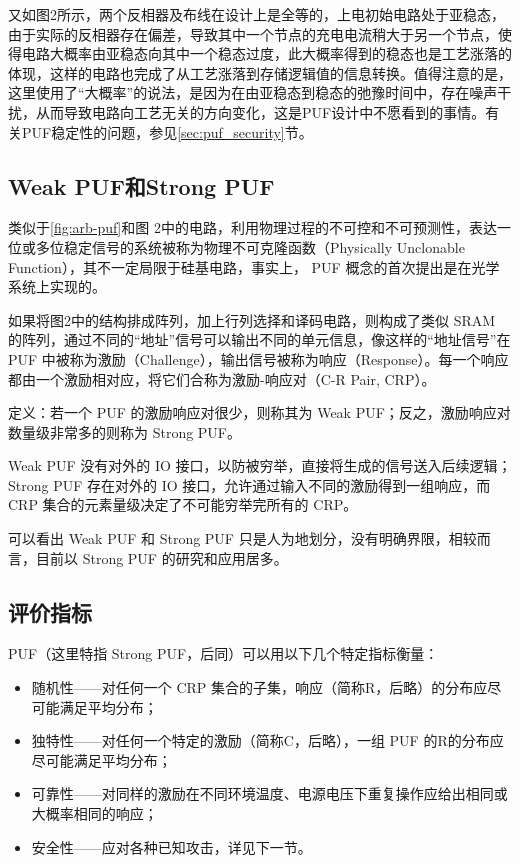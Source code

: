 又如图2所示，两个反相器及布线在设计上是全等的，上电初始电路处于亚稳态，由于实际的反相器存在偏差，导致其中一个节点的充电电流稍大于另一个节点，使得电路大概率由亚稳态向其中一个稳态过度，此大概率得到的稳态也是工艺涨落的体现，这样的电路也完成了从工艺涨落到存储逻辑值的信息转换。值得注意的是，这里使用了``大概率''的说法，是因为在由亚稳态到稳态的弛豫时间中，存在噪声干扰，从而导致电路向工艺无关的方向变化，这是PUF设计中不愿看到的事情。有关PUF稳定性的问题，参见\ref{sec:puf_security}节。
\subsection{Weak PUF和Strong PUF}
类似于\ref{fig:arb-puf}和图 2中的电路，利用物理过程的不可控和不可预测性，表达一位或多位稳定信号的系统被称为物理不可克隆函数（Physically Unclonable Function），其不一定局限于硅基电路，事实上， PUF 概念的首次提出是在光学系统上实现的。

如果将图2中的结构排成阵列，加上行列选择和译码电路，则构成了类似 SRAM 的阵列，通过不同的``地址''信号可以输出不同的单元信息，像这样的``地址信号''在 PUF 中被称为激励（Challenge），输出信号被称为响应（Response）。每一个响应都由一个激励相对应，将它们合称为激励-响应对（C-R Pair, CRP）。

定义：若一个 PUF 的激励响应对很少，则称其为 Weak PUF；反之，激励响应对数量级非常多的则称为 Strong PUF。

Weak PUF 没有对外的 IO 接口，以防被穷举，直接将生成的信号送入后续逻辑；Strong PUF 存在对外的 IO 接口，允许通过输入不同的激励得到一组响应，而 CRP 集合的元素量级决定了不可能穷举完所有的 CRP。

可以看出 Weak PUF 和 Strong PUF 只是人为地划分，没有明确界限，相较而言，目前以 Strong PUF 的研究和应用居多。
\subsection{评价指标}
PUF（这里特指 Strong PUF，后同）可以用以下几个特定指标衡量：
\begin{itemize}
\item 随机性——对任何一个 CRP 集合的子集，响应（简称R，后略）的分布应尽可能满足平均分布；
\item 独特性——对任何一个特定的激励（简称C，后略），一组 PUF 的R的分布应尽可能满足平均分布；
\item 可靠性——对同样的激励在不同环境温度、电源电压下重复操作应给出相同或大概率相同的响应；
\item 安全性——应对各种已知攻击，详见下一节。
\end{itemize}

